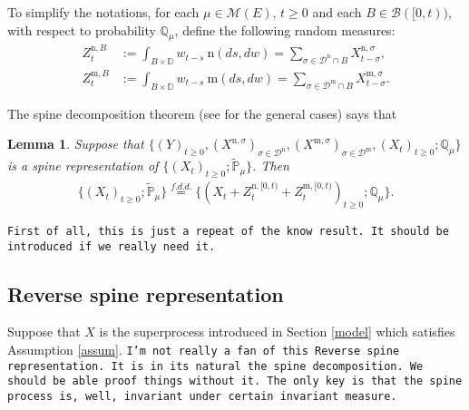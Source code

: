 \documentclass[12pt,a4paper]{amsart}
\numberwithin{equation}{section}
\theoremstyle{plain}
\newtheorem{lem}[thm]{Lemma}
\theoremstyle{definition}
\theoremstyle{remark}
\begin{document}
	To simplify the notations, for each $\mu \in \mathcal M(E)$,
	$t\geq 0$ and each $B \in \mathscr B([0,t))$, with respect to probability $\mathbb Q_\mu$, define the following random measures:
\begin{align}
	Z^{\mathrm n,B}_t
	&:= \int_{B\times \mathbb D} w_{t-s} ~\mathrm n (ds,dw)
	= \sum_{\sigma \in \mathcal D^\mathrm n \cap B} X^{\mathrm n,\sigma}_{t-\sigma},
	\\ Z^{\mathrm m,B}_t
	&:= \int_{B\times \mathbb D} w_{t-s} ~\mathrm m (ds,dw)
	= \sum_{\sigma \in \mathcal D^\mathrm m \cap B} X^{\mathrm m,\sigma}_{t-\sigma}.
\end{align}

	The spine decomposition theorem (see \cite{RenSongSun2017Spine} for the general cases) says that
\begin{lem}\label{spine structure}
	Suppose that $\{(Y)_{t\geq 0}, (X^{\mathrm n, \sigma})_{\sigma\in \mathcal D^\mathrm n}, (X^{\mathrm m, \sigma})_{\sigma \in \mathcal D^\mathrm m}, (X_t)_{t\geq 0}; \mathbb Q_{\mu}\}$ is a spine representation of $\{(X_t)_{t\geq 0}; \widetilde {\mathbb P}_\mu\}$. Then
\begin{align}
	\{(X_t)_{t\geq 0}; \widetilde{\mathbb P}_\mu\}
	\overset{f.d.d.}{=}
	\{(X_t + Z^{\mathrm n, [0,t)}_{t} + Z^{\mathrm m, [0,t)}_{t} )_{t\geq 0}; \mathbb Q_\mu\}.
\end{align}
\end{lem}
	{\tt First of all, this is just a repeat of the know result. It should be introduced if we really need it.}
\subsection{Reverse spine representation}
Suppose that $X$ is the superprocess introduced in Section \ref{model} which satisfies Assumption \ref{assum}.
	{\tt I'm not really a fan of this Reverse spine representation. It is in its natural the spine decomposition. We should be able proof things without it.
	The only key is that the spine process is, well, invariant under certain invariant measure.}
\end{document}
